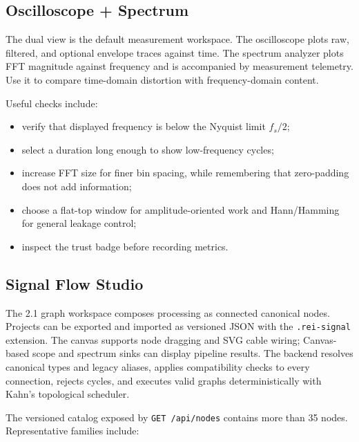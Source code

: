 \documentclass[10pt,a4paper]{article}
\newcommand{\code}[1]{\nolinkurl{#1}}
\begin{document}
\subsection{Oscilloscope + Spectrum}

The dual view is the default measurement workspace. The oscilloscope plots raw, filtered, and optional envelope traces against time. The spectrum analyzer plots FFT magnitude against frequency and is accompanied by measurement telemetry. Use it to compare time-domain distortion with frequency-domain content.

Useful checks include:
\begin{itemize}
  \item verify that displayed frequency is below the Nyquist limit $f_s/2$;
  \item select a duration long enough to show low-frequency cycles;
  \item increase FFT size for finer bin spacing, while remembering that zero-padding does not add information;
  \item choose a flat-top window for amplitude-oriented work and Hann/Hamming for general leakage control;
  \item inspect the trust badge before recording metrics.
\end{itemize}

\subsection{Signal Flow Studio}

The 2.1 graph workspace composes processing as connected canonical nodes. Projects can be exported and imported as versioned JSON with the \code{.rei-signal} extension. The canvas supports node dragging and SVG cable wiring; Canvas-based scope and spectrum sinks can display pipeline results. The backend resolves canonical types and legacy aliases, applies compatibility checks to every connection, rejects cycles, and executes valid graphs deterministically with Kahn's topological scheduler.

The versioned catalog exposed by \code{GET /api/nodes} contains more than 35 nodes. Representative families include:
\end{document}

